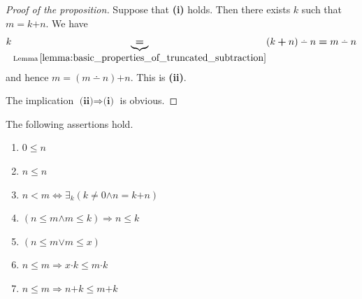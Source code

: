 \documentclass[10pt]{amsart}
\newcommand{\mexists}{\boldsymbol{\exists}}
\newcommand{\mra}{\boldsymbol{\Rightarrow}}
\newcommand{\mequiv}{\boldsymbol{\Leftrightarrow}}
\newcommand{\mand}{\boldsymbol{\wedge}}
\newcommand{\mor}{\boldsymbol{\vee}}
\newcommand{\mle}{\boldsymbol{<}}
\newcommand{\mleq}{\boldsymbol{\leq}}
\newcommand{\meq}{\boldsymbol{=}}
\newcommand{\mneq}{\boldsymbol{\neq}}
\newcommand{\mplus}{\boldsymbol{+}}
\newcommand{\mdot}{\boldsymbol{\cdot}}
\begin{document}
\begin{proof}[Proof of the proposition]
	Suppose that \textbf{(i)} holds. Then there exists $k$ such that $m \meq k \mplus n$. We have
	$$k \underbrace{\meq}_{\mathrm{Lemma\,}\ref{lemma:basic_properties_of_truncated_subtraction}} (k \mplus n) \dotminus n \meq m \dotminus n$$
	and hence $m \meq (m\dotminus n) \mplus n$. This is \textbf{(ii)}.

	The implication $\textbf{(ii)}\Rightarrow \textbf{(i)}$ is obvious.
\end{proof}

\begin{theorem}\label{theorem:order_is_linear_and_compatible_with_addition_and_multiplication}
	The following assertions hold.
	\begin{enumerate}[label=\emph{\textbf{(\arabic*)}}, leftmargin=3.0em]
		\item $0 \mleq n$
		\item $n \mleq n$
		\item $n \mle m \mequiv \mexists_k\left(k \mneq 0 \mand n \meq k \mplus n\right)$
  	\item $\left(n \mleq m \mand m \mleq k\right) \mra n \mleq k$
		\item $\left(n \mleq m \mor m \mleq x\right)$
		\item $n \mleq m \mra x\mdot k \mleq m \mdot k$
		\item $n \mleq m \mra n \mplus k \mleq m \mplus k$
	\end{enumerate}
\end{theorem}
\end{document}
